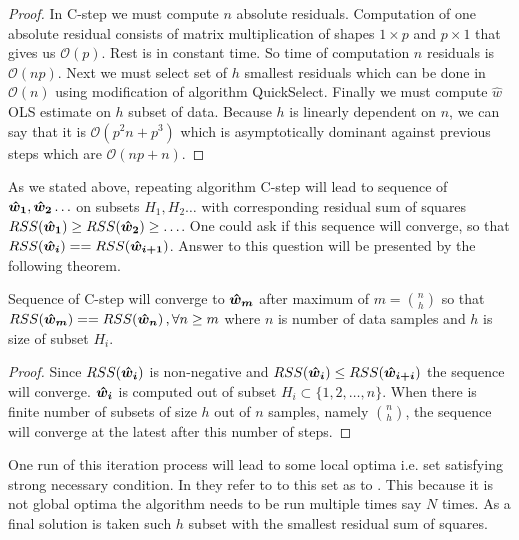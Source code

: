 \begin{proof}
	In C-step we must compute $n$ absolute residuals. Computation of one absolute residual consists of
	matrix multiplication of shapes $1 \times p$ and $p \times 1$ that gives us $\mathcal{O}(p)$. Rest is in constant time.
	So time of computation $n$ residuals is $\mathcal{O}(np)$.
	Next we must select set of $h$ smallest residuals which can be done in $\mathcal{O}(n)$ using modification of algorithm QuickSelect.  
	Finally we must compute $\hat{w}$ OLS estimate on $h$ subset of data.
	Because $h$ is linearly dependent on $n$, we can say that it is $\mathcal{O}(p^2n + p^3)$ which 
	is asymptotically dominant against previous steps which are $\mathcal{O}(np + n)$.
\end{proof}

As we stated above, repeating algorithm C-step will lead to sequence of $\boldsymbol{\hat{w}_1}, \boldsymbol{\hat{w}_2} \ldots$ 
on subsets $H_1, H_2 \ldots$ with corresponding residual sum of squares
$RSS(\boldsymbol{\hat{w}_{1}}) \geq RSS(\boldsymbol{\hat{w}_{2}}) \geq \ldots$. One could ask if this sequence will converge, so that
$RSS(\boldsymbol{\hat{w}_{i}}) == RSS(\boldsymbol{\hat{w}_{i+1}})$. 
Answer to this question will be presented by the following theorem.


\begin{theorem}
	Sequence of C-step will converge to $\boldsymbol{\hat{w}_{m}}$ after maximum of $m = {n \choose h}$
	so that $RSS(\boldsymbol{\hat{w}_{m}}) == RSS(\boldsymbol{\hat{w}_{n}})\,, \forall n\geq m$ where $n$ is number of data samples 
	and $h$ is size of subset $H_i$.
\end{theorem}

\begin{proof}
	Since  $RSS(\boldsymbol{\hat{w}_{i}})$ is non-negative and $RSS(\boldsymbol{\hat{w}_{i}}) \leq RSS(\boldsymbol{\hat{w}_{i+i}})$ the 
	sequence will converge. $\boldsymbol{\hat{w}_{i}}$  is computed out of subset 
	$H_i \subset \{{1,2,\ldots,n\}}$. When there is finite number of subsets of size $h$ out of $n$ samples, namely ${n \choose h}$, the sequence will converge at the latest after this number of steps.
\end{proof}


One run of this iteration process will lead to some local optima i.e. set satisfying strong necessary condition. In \cite{hawkins:1994} they refer to to this set as to .
This because it is not global optima the algorithm needs to be run multiple times say $N$ times. As a final solution is taken such $h$  subset with the smallest residual sum of squares. 

